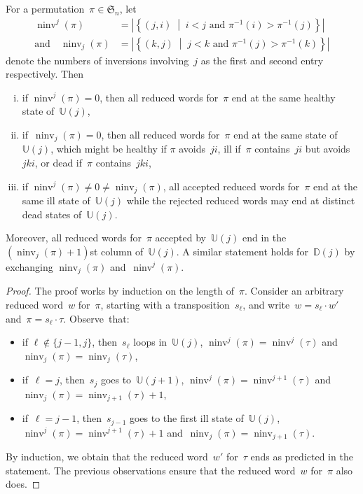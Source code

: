 \documentclass[ALCO]{cedram}
\newcommand{\fS}{\mathfrak{S}}
\newcommand{\set}[2]{\left\{ #1 \;\middle|\; #2 \right\}}
\DeclareMathOperator{\ninv}{ninv}
\newcommand{\automatonU}{\mathbb{U}}
\newcommand{\automatonD}{\mathbb{D}}
\begin{document}
\begin{proposition}\label{prop:sameStateAcceptedReducedExpressionsRefined}
For a permutation~$\pi \in \fS_n$, let
\begin{align*}
\ninv^j(\pi) &= |\set{(j,i)}{i < j  \text{ and }  \pi^{-1}(i) > \pi^{-1}(j)}| \\
\text{and} \quad
\ninv_j(\pi) &= |\set{(k,j)}{j < k \text{ and } \pi^{-1}(j) > \pi^{-1}(k)}|
\end{align*}
denote the numbers of inversions involving~$j$ as the first and second entry respectively. Then
\begin{enumerate}[(i)]
	\item if $\ninv^j(\pi) = 0$, then all reduced words for~$\pi$ end at the same healthy state of~$\automatonU(j)$,
	\item if~$\ninv_j(\pi) = 0$, then all reduced words for~$\pi$ end at the same state of~$\automatonU(j)$, which might be healthy if $\pi$ avoids~$ji$, ill if~$\pi$ contains~$ji$ but avoids~$jki$, or dead if~$\pi$ contains~$jki$,
	\item if $\ninv^j(\pi) \ne 0 \ne \ninv_j(\pi)$, all accepted reduced words for~$\pi$ end at the same ill state of~$\automatonU(j)$ while the rejected reduced words may end at distinct dead states of~$\automatonU(j)$.
\end{enumerate}
Moreover, all reduced words for~$\pi$ accepted by~$\automatonU(j)$ end in the $(\ninv_j(\pi)+1)$st column of~$\automatonU(j)$.
A similar statement holds for~$\automatonD(j)$ by exchanging $\ninv_j(\pi)$ and~$\ninv^j(\pi)$.
\end{proposition}

\begin{proof}
The proof works by induction on the length of~$\pi$.
Consider an arbitrary reduced word~$w$ for~$\pi$, starting with a transposition~$s_\ell$, and write~$w = s_\ell \cdot w'$ and~$\pi = s_\ell \cdot \tau$.
Observe~that:
\begin{itemize}
	\item if $\ell \notin \{j-1, j\}$, then~$s_\ell$ loops in~$\automatonU(j)$, $\ninv^j(\pi) = \ninv^j(\tau)$ and $\ninv_j(\pi) = \ninv_j(\tau)$,
	\item if~$\ell = j$, then~$s_j$ goes to~$\automatonU(j+1)$, $\ninv^j(\pi) = \ninv^{j+1}(\tau)$ and~$\ninv_j(\pi) = \ninv_{j+1}(\tau) + 1$,
	\item if~$\ell = j-1$, then~$s_{j-1}$ goes to the first ill state of~$\automatonU(j)$, $\ninv^j(\pi) = {\ninv^{j+1}(\tau) + 1}$ and~$\ninv_j(\pi) = \ninv_{j+1}(\tau)$.
\end{itemize}
By induction, we obtain that the reduced word~$w'$ for~$\tau$ ends as predicted in the statement.
The previous observations ensure that the reduced word~$w$ for~$\pi$ also does.
\end{proof}
\end{document}
